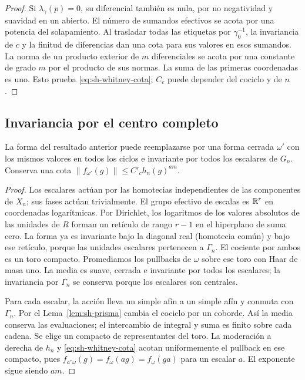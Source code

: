 \begin{proof}
Si $\lambda_\gamma(p)=0$, su diferencial también es nula, por no negatividad y suavidad en un abierto. El número de sumandos efectivos se acota por una potencia del solapamiento. Al trasladar todas las etiquetas por $\gamma_0^{-1}$, la invariancia de $c$ y la finitud de diferencias dan una cota para sus valores en esos sumandos. La norma de un producto exterior de $m$ diferenciales se acota por una constante de grado $m$ por el producto de sus normas. La suma de las primeras coordenadas es uno. Esto prueba \eqref{eq:sh-whitney-cota}; $C_c$ puede depender del cociclo y de $n$.
\end{proof}

\subsection{Invariancia por el centro completo}

\begin{proposicion}
\label{prop:sh-centro}
La forma del resultado anterior puede reemplazarse por una forma cerrada $\omega'$ con los mismos valores en todos los ciclos e invariante por todos los escalares de $G_n$. Conserva una cota $\|f_{\omega'}(g)\|\le C'_c h_n(g)^{am}$.
\end{proposicion}
\begin{proof}
Los escalares actúan por las homotecias independientes de las componentes de $X_n$; sus fases actúan trivialmente. El grupo efectivo de escalas es $\mathbb{R}^r$ en coordenadas logarítmicas. Por Dirichlet, los logaritmos de los valores absolutos de las unidades de $R$ forman un retículo de rango $r-1$ en el hiperplano de suma cero. La forma ya es invariante bajo la diagonal real (homotecia común) y bajo ese retículo, porque las unidades escalares pertenecen a $\Gamma_n$. El cociente por ambos es un toro compacto. Promediamos los pullbacks de $\omega$ sobre ese toro con Haar de masa uno. La media es suave, cerrada e invariante por todos los escalares; la invariancia por $\Gamma_n$ se conserva porque los escalares son centrales.

Para cada escalar, la acción lleva un simple afín a un simple afín y conmuta con $\Gamma_n$. Por el Lema~\ref{lem:sh-prisma} cambia el cociclo por un coborde. Así la media conserva las evaluaciones; el intercambio de integral y suma es finito sobre cada cadena. Se elige un compacto de representantes del toro. La moderación a derecha de $h_n$ y \eqref{eq:sh-whitney-cota} acotan uniformemente el pullback en ese compacto, pues $f_{a^*\omega}(g)=f_\omega(ag)=f_\omega(ga)$ para un escalar $a$. El exponente sigue siendo $am$.
\end{proof}

